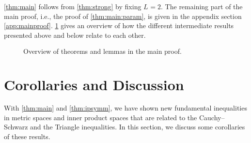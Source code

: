 \documentclass{article}
\newcommand{\ctransymbol}{L}
\newcommand{\ctrano}[1]{\ctransymbol_{#1}}
\newcommand{\ctransqr}{\ctrano{}}
\begin{document}
%
\cref{thm:main} follows from \cref{thm:strong} by fixing $\ctransqr = 2$.
The remaining part of the main proof, i.e., the proof of \cref{thm:main:param}, is given in the appendix section \ref{app:mainproof}. \cref{fig:proof:overview} gives an overview of how the different intermediate results presented above and below relate to each other. 
%
\begin{figure}
	\begin{figure}[omitted: a diagram of this paper's results, not reproduced here]\end{figure}
	\caption{Overview of theorems and lemmas in the main proof.}\label{fig:proof:overview}
\end{figure}
%
%
\section{Corollaries and Discussion}\label{sec:impl}
%
With \cref{thm:main} and \cref{thm:ipsymm}, we have shown new fundamental inequalities in metric spaces and inner product spaces that are related to the Cauchy--Schwarz and the Triangle inequalities. In this section, we discuss some corollaries of these results.
%
%
%
\end{document}
